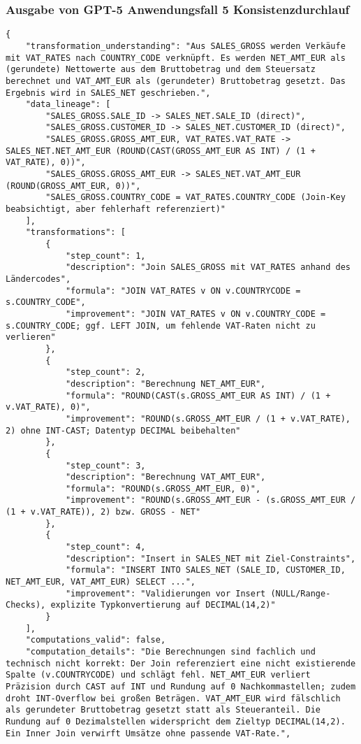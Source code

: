\subsubsection{Ausgabe von GPT-5 Anwendungsfall 5 Konsistenzdurchlauf}\label{anhang:subsubsec:gpt_case5_prompt2}
\begin{lstlisting}[caption={Ausgabe: GPT-5 Anwendungsfall 5 Konsistenzdurchlauf},label={gpt_case5_prompt2}]
{
    "transformation_understanding": "Aus SALES_GROSS werden Verkäufe mit VAT_RATES nach COUNTRY_CODE verknüpft. Es werden NET_AMT_EUR als (gerundete) Nettowerte aus dem Bruttobetrag und dem Steuersatz berechnet und VAT_AMT_EUR als (gerundeter) Bruttobetrag gesetzt. Das Ergebnis wird in SALES_NET geschrieben.",
    "data_lineage": [
        "SALES_GROSS.SALE_ID -> SALES_NET.SALE_ID (direct)",
        "SALES_GROSS.CUSTOMER_ID -> SALES_NET.CUSTOMER_ID (direct)",
        "SALES_GROSS.GROSS_AMT_EUR, VAT_RATES.VAT_RATE -> SALES_NET.NET_AMT_EUR (ROUND(CAST(GROSS_AMT_EUR AS INT) / (1 + VAT_RATE), 0))",
        "SALES_GROSS.GROSS_AMT_EUR -> SALES_NET.VAT_AMT_EUR (ROUND(GROSS_AMT_EUR, 0))",
        "SALES_GROSS.COUNTRY_CODE = VAT_RATES.COUNTRY_CODE (Join-Key beabsichtigt, aber fehlerhaft referenziert)"
    ],
    "transformations": [
        {
            "step_count": 1,
            "description": "Join SALES_GROSS mit VAT_RATES anhand des Ländercodes",
            "formula": "JOIN VAT_RATES v ON v.COUNTRYCODE = s.COUNTRY_CODE",
            "improvement": "JOIN VAT_RATES v ON v.COUNTRY_CODE = s.COUNTRY_CODE; ggf. LEFT JOIN, um fehlende VAT-Raten nicht zu verlieren"
        },
        {
            "step_count": 2,
            "description": "Berechnung NET_AMT_EUR",
            "formula": "ROUND(CAST(s.GROSS_AMT_EUR AS INT) / (1 + v.VAT_RATE), 0)",
            "improvement": "ROUND(s.GROSS_AMT_EUR / (1 + v.VAT_RATE), 2) ohne INT-CAST; Datentyp DECIMAL beibehalten"
        },
        {
            "step_count": 3,
            "description": "Berechnung VAT_AMT_EUR",
            "formula": "ROUND(s.GROSS_AMT_EUR, 0)",
            "improvement": "ROUND(s.GROSS_AMT_EUR - (s.GROSS_AMT_EUR / (1 + v.VAT_RATE)), 2) bzw. GROSS - NET"
        },
        {
            "step_count": 4,
            "description": "Insert in SALES_NET mit Ziel-Constraints",
            "formula": "INSERT INTO SALES_NET (SALE_ID, CUSTOMER_ID, NET_AMT_EUR, VAT_AMT_EUR) SELECT ...",
            "improvement": "Validierungen vor Insert (NULL/Range-Checks), explizite Typkonvertierung auf DECIMAL(14,2)"
        }
    ],
    "computations_valid": false,
    "computation_details": "Die Berechnungen sind fachlich und technisch nicht korrekt: Der Join referenziert eine nicht existierende Spalte (v.COUNTRYCODE) und schlägt fehl. NET_AMT_EUR verliert Präzision durch CAST auf INT und Rundung auf 0 Nachkommastellen; zudem droht INT-Overflow bei großen Beträgen. VAT_AMT_EUR wird fälschlich als gerundeter Bruttobetrag gesetzt statt als Steueranteil. Die Rundung auf 0 Dezimalstellen widerspricht dem Zieltyp DECIMAL(14,2). Ein Inner Join verwirft Umsätze ohne passende VAT-Rate.",

\end{lstlisting}
